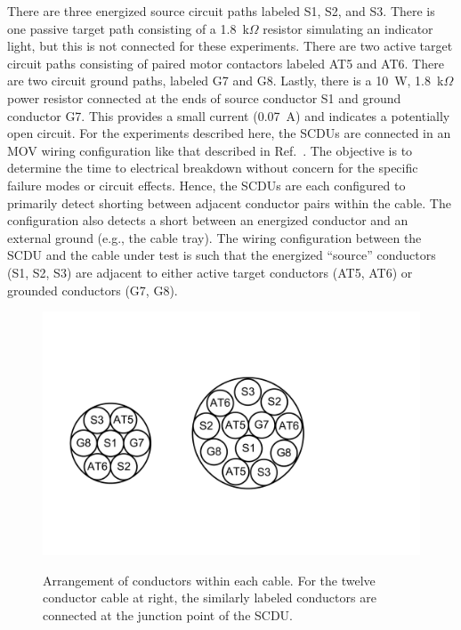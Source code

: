 There are three energized source circuit paths labeled S1, S2, and S3. There is one passive target path consisting of a 1.8~k$\Omega$ resistor simulating an indicator light, but this is not connected for these experiments. There are two active target circuit paths consisting of paired motor contactors labeled AT5 and AT6. There are two circuit ground paths, labeled G7 and G8. Lastly, there is a 10~W, 1.8~k$\Omega$ power resistor connected at the ends of source conductor S1 and ground conductor G7. This provides a small current (0.07~A) and indicates a potentially open circuit. For the experiments described here, the SCDUs are connected in an MOV wiring configuration like that described in Ref.~\cite{CAROLFIRE}.  The objective is to determine the time to electrical breakdown without concern for the specific failure modes or circuit effects. Hence, the SCDUs are each configured to primarily detect shorting between adjacent conductor pairs within the cable.  The configuration also detects a short between an energized conductor and an external ground (e.g., the cable tray). The wiring configuration between the SCDU and the cable under test is such that the energized ``source'' conductors (S1, S2, S3) are adjacent to either active target conductors (AT5, AT6) or grounded conductors (G7, G8).

\begin{figure}[ht]
\centering
\vspace{-0.5in}
\includegraphics[width=5.5in]{../FIGURES/Cable_Cross_Section} \\
\vspace{-0.5in}
\caption[Diagram of cable conductors]{Arrangement of conductors within each cable. For the twelve conductor cable at right, the similarly labeled conductors are connected at the junction point of the SCDU.}
\label{cable_cross_section}
\end{figure}

